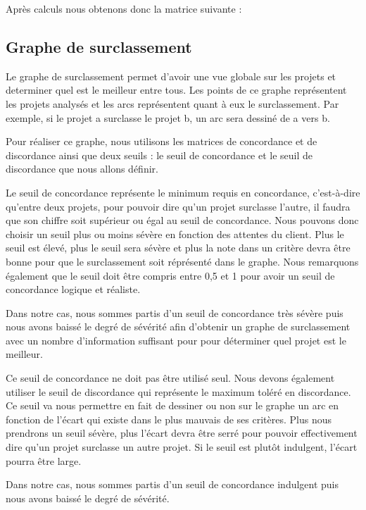 \documentclass[a4paper,10pt]{article}
\begin{document}
Après calculs nous obtenons donc la matrice suivante :

 
\subsection{Graphe de surclassement}

Le graphe de surclassement permet d'avoir une vue globale sur les projets et determiner quel est le meilleur entre tous. Les points de ce graphe représentent les projets analysés et les arcs représentent quant à eux le surclassement. Par exemple, si le projet a surclasse le projet b, un arc sera dessiné de a vers b.

Pour réaliser ce graphe, nous utilisons les matrices de concordance et de discordance ainsi que deux seuils : le seuil de concordance et le seuil de discordance que nous allons définir.

Le seuil de concordance représente le minimum requis en concordance, c'est-à-dire qu'entre deux projets, pour pouvoir dire qu'un projet surclasse l'autre, il faudra que son chiffre soit supérieur ou égal au seuil de concordance. Nous pouvons donc choisir un seuil plus ou moins sévère en fonction des attentes du client. Plus le seuil est élevé, plus le seuil sera sévère et plus la note dans un critère devra être bonne pour que le surclassement soit réprésenté dans le graphe. Nous remarquons également que le seuil doit être compris entre 0,5 et 1 pour avoir un seuil de concordance logique et réaliste. 

Dans notre cas, nous sommes partis d'un seuil de concordance très sévère puis nous avons baissé le degré de sévérité afin d'obtenir un graphe de surclassement avec un nombre d'information suffisant pour pour déterminer quel projet est le meilleur.

Ce seuil de concordance ne doit pas être utilisé seul. Nous devons également utiliser le seuil de discordance qui représente le maximum toléré en discordance. Ce seuil va nous permettre en fait de dessiner ou non sur le graphe un arc en fonction de l'écart qui existe dans le plus mauvais de ses critères. Plus nous prendrons un seuil sévère, plus l'écart devra être serré pour pouvoir effectivement dire qu'un projet surclasse un autre projet. Si le seuil est plutôt indulgent, l'écart pourra être large.

Dans notre cas, nous sommes partis d'un seuil de concordance indulgent puis nous avons baissé le degré de sévérité. 
\end{document}
